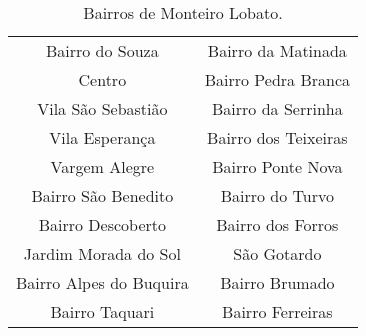\begin{table}[htbp]
  \centering
  \caption{Bairros de Monteiro Lobato.}
    \begin{tabular}{c|c}
    \rowcolor[rgb]{ .984,  .831,  .706} Bairro do Souza & Bairro da Matinada \\
    \rowcolor[rgb]{ .992,  .914,  .851} Centro & Bairro Pedra Branca \\
    \rowcolor[rgb]{ .984,  .831,  .706} Vila São Sebastião & Bairro da Serrinha \\
    \rowcolor[rgb]{ .992,  .914,  .851} Vila Esperança & Bairro dos Teixeiras \\
    \rowcolor[rgb]{ .984,  .831,  .706} Vargem Alegre & Bairro Ponte Nova \\
    \rowcolor[rgb]{ .992,  .914,  .851} Bairro São Benedito & Bairro do Turvo \\
    \rowcolor[rgb]{ .984,  .831,  .706} Bairro Descoberto & Bairro dos Forros \\
    \rowcolor[rgb]{ .992,  .914,  .851} Jardim Morada do Sol & São Gotardo \\
    \rowcolor[rgb]{ .984,  .831,  .706} Bairro Alpes do Buquira & Bairro Brumado \\
    \rowcolor[rgb]{ .992,  .914,  .851} Bairro Taquari & Bairro Ferreiras \\
    \end{tabular}%
  \label{tab:bairros}%
\end{table}%
